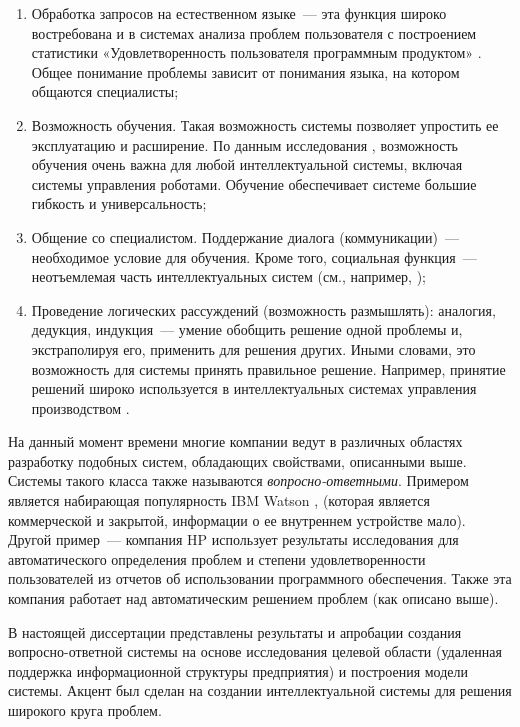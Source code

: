 \begin{enumerate}
  \item Обработка запросов на естественном языке~--- эта функция широко востребована и в системах анализа проблем пользователя с построением статистики «Удовлетворенность пользователя программным продуктом» \cite{TUTUB-1}. Общее понимание проблемы зависит от понимания языка, на котором общаются специалисты;
  \item Возможность обучения. Такая возможность системы позволяет упростить ее эксплуатацию и расширение. По данным исследования \cite{LEARN-1}, возможность обучения очень важна для любой интеллектуальной системы, включая системы управления роботами. Обучение обеспечивает системе большие гибкость и универсальность;
  \item Общение со специалистом. Поддержание диалога (коммуникации)~--- необходимое условие для обучения. Кроме того, социальная функция~--- неотъемлемая часть интеллектуальных систем (см., например, \cite{LEARN-2});
  \item Проведение логических рассуждений (возможность размышлять): аналогия, дедукция, индукция~--- умение обобщить решение одной проблемы и, экстраполируя его, применить для решения других. Иными словами, это возможность для системы принять правильное решение. Например, принятие решений широко используется в интеллектуальных системах управления производством  \cite{LEARN-3}.
\end{enumerate}

На данный момент времени многие компании ведут в различных областях разработку подобных систем, обладающих свойствами, описанными выше. Системы такого класса также называются \textit{вопросно-ответными}. Примером является набирающая популярность IBM Watson \cite{WATSON-PO}, \cite{WATSON-PTOP} (которая является коммерческой и закрытой, информации о ее внутреннем устройстве мало). Другой пример~--- компания HP использует результаты исследования \cite{TUTUB-2} для автоматического определения проблем и степени удовлетворенности пользователей из отчетов об использовании программного обеспечения. Также эта компания работает над автоматическим решением проблем (как описано выше). \par

В настоящей диссертации представлены результаты и апробации создания вопросно-ответной системы на основе исследования целевой области (удаленная поддержка информационной структуры предприятия) и построения модели системы. Акцент был сделан на создании интеллектуальной системы для решения широкого круга проблем. \par

